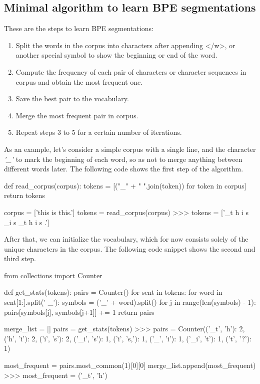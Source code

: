 \subsection{Minimal algorithm to learn BPE segmentations}

These are the steps to learn BPE segmentations:

\begin{enumerate}
    \item Split the words in the corpus into characters after appending </w>, or another special symbol to show the beginning or end of the word.
    \item Compute the frequency of each pair of characters or character sequences in corpus and obtain the most frequent one.
    \item Save the best pair to the vocabulary.
    \item Merge the most frequent pair in corpus.
    \item Repeat steps 3 to 5 for a certain number of iterations.
\end{enumerate}

As an example, let's consider a simple corpus with a single line, and the character \emph{'\_'} to mark the beginning of each word, so as not to merge anything between different words later. The following code shows the first step of the algorithm.

\begin{python}
def read_corpus(corpus):
    tokens = [("_" + " ".join(token)) for token in corpus]
    return tokens

corpus = ['this is this.']
tokens = read_corpus(corpus)
>>> tokens = ['_t h i s _i s _t h i s .']
\end{python}

After that, we can initialize the vocabulary, which for now consists solely of the unique characters in the corpus. The following code snippet shows the second and third step.

\begin{python}
from collections import Counter

def get_stats(tokens):
    pairs = Counter()
    for sent in tokens:
        for word in sent[1:].split(' _'):
            symbols = ('_' + word).split()
            for j in range(len(symbols) - 1):
                pairs[symbols[j], symbols[j+1]] += 1
    return pairs

merge_list = []
pairs = get_stats(tokens)
>>> pairs = Counter({('_t', 'h'): 2, ('h', 'i'): 2, ('i', 's'): 2, 
                    ('_i', 's'): 1, ('i', 's,'): 1, ('_', 'i'): 1, 
                    ('_i', 't'): 1, ('t', '?'): 1})

most_frequent = pairs.most_common(1)[0][0]
merge_list.append(most_frequent)
>>> most_frequent = ('_t', 'h')
\end{python}

